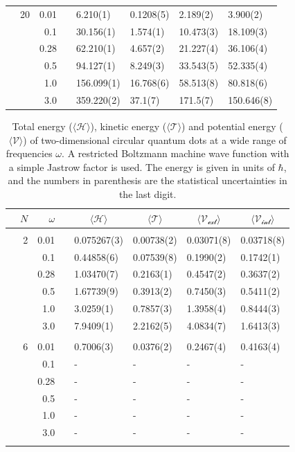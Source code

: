 \begin{table}
\begin{tabularx}{\textwidth}{R{1.5cm}rrcR{2.3cm}R{2.3cm}R{2.3cm}R{2.3cm}}
		&20 & 0.01 && 6.210(1) & 0.1208(5) & 2.189(2) & 3.900(2) \\
		&& 0.1 && 30.156(1) & 1.574(1) & 10.473(3) & 18.109(3) \\
		&& 0.28 && 62.210(1) & 4.657(2) & 21.227(4) & 36.106(4) \\
		&& 0.5 && 94.127(1) & 8.249(3) & 33.543(5) & 52.335(4) \\
		&& 1.0 && 156.099(1) & 16.768(6) & 58.513(8) & 80.818(6) \\
		&& 3.0 && 359.220(2) & 37.1(7) & 171.5(7) & 150.646(8) \\ \hline \hline
	\end{tabularx}
\end{table} 

\begin{table}
	\caption{Total energy ($\langle\mathcal{H}\rangle$), kinetic energy ($\langle\mathcal{T}\rangle$) and potential energy ($\langle\mathcal{V}\rangle$) of two-dimensional circular quantum dots at a wide range of frequencies $\omega$. A restricted Boltzmann machine wave function with a simple Jastrow factor is used. The energy is given in units of $\hbar$, and the numbers in parenthesis are the statistical uncertainties in the last digit.}
	\label{tab:splitfrequencyQDRBMSJ}
	\begin{tabularx}{\textwidth}{R{1.5cm}rrcR{2.3cm}R{2.3cm}R{2.3cm}R{2.3cm}} \hline\hline
		& & $\omega$ &&  &  &  &  \\ \hline \\
		&2 & 0.01 && 0.075267(3) & 0.00738(2) & 0.03071(8) & 0.03718(8) \\
		&& 0.1 && 0.44858(6) & 0.07539(8) & 0.1990(2) & 0.1742(1) \\
		&& 0.28 && 1.03470(7) & 0.2163(1) & 0.4547(2) & 0.3637(2) \\
		&& 0.5 && 1.67739(9) & 0.3913(2) & 0.7450(3) & 0.5411(2)\\
		&& 1.0 && 3.0259(1) & 0.7857(3) & 1.3958(4) & 0.8444(3)\\
		&& 3.0 && 7.9409(1) & 2.2162(5) & 4.0834(7) & 1.6413(3) \\ \hdashline \\
		
		&6 & 0.01 && 0.7006(3) & 0.0376(2) & 0.2467(4) & 0.4163(4) \\
		&& 0.1 && - & - & - & - \\
		&& 0.28 && - & - & - & - \\
		&& 0.5 && - & - & - & - \\
		&& 1.0 && - & - & - & - \\
		&& 3.0 && - & - & - & - \\ \hdashline \\
		

\end{tabularx}
\end{table}
